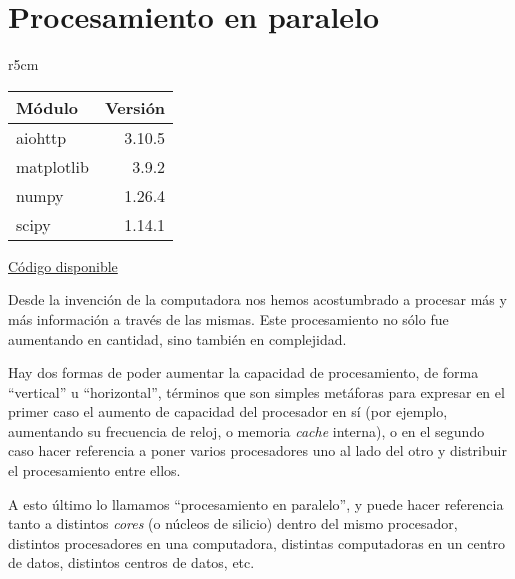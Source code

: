 

\chapter{Procesamiento en paralelo} \label{ch:proc_paralelo}

\begin{wraptable}{r}{5cm}
\begin{modulesinfo}
\begin{center}
{\small
    \begin{tabular}{l r}
        \toprule
        \textbf{Módulo} & \textbf{Versión} \\
        \midrule
        aiohttp & 3.10.5 \\
        matplotlib & 3.9.2 \\
        numpy & 1.26.4 \\
        scipy & 1.14.1 \\
        \bottomrule
    \end{tabular}
    \vspace{0.75em}

    \href{https://github.com/facundobatista/libro-pyciencia/tree/master/código/proc_paralelo/}{Código disponible}
}
\end{center}
\end{modulesinfo}
\end{wraptable}


Desde la invención de la computadora nos hemos acostumbrado a procesar más y más información a través de las mismas. Este procesamiento no sólo fue aumentando en cantidad, sino también en complejidad.

Hay dos formas de poder aumentar la capacidad de procesamiento, de forma ``vertical'' u ``horizontal'', términos que son simples metáforas para expresar en el primer caso el aumento de capacidad del procesador en sí (por ejemplo, aumentando su frecuencia de reloj, o memoria \textit{cache} interna), o en el segundo caso hacer referencia a poner varios procesadores uno al lado del otro y distribuir el procesamiento entre ellos.

A esto último lo llamamos ``procesamiento en paralelo'', y puede hacer referencia tanto a distintos \textit{cores} (o núcleos de silicio) dentro del mismo procesador, distintos procesadores en una computadora, distintas computadoras en un centro de datos, distintos centros de datos, etc.

